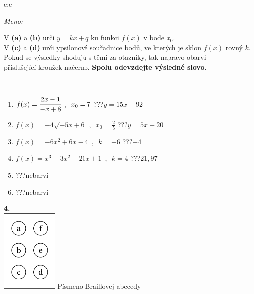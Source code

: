 \documentclass[10pt]{report}
\begin{document}
\begin{tabular}{c:c}
\begin{minipage}[c][104.5mm][t]{0.5\linewidth}
\begin{center}
\textit{Meno:}\phantom{xxxxxxxxxxxxxxxxxxxxxxxxxxxxxxxxxxxxxxxxxxxxxxxxxxxxxxxxxxxxxxxxx}\\[5mm]
\begin{minipage}{0.95\linewidth}
\begin{center}
V \textbf{(a)} a \textbf{(b)} urči  $y = kx + q$ ku funkci $f(x)$ v bode $x_0$.\\V \textbf{(c)} a \textbf{(d)} urči ypsilonové souřadnice bodů, ve kterých je sklon $f(x)$ rovný $k$.\\Pokud se výsledky shodujú s těmi za otazníky, tak napravo obarvi\\příslušející kroužek načerno. \textbf{Spolu odevzdejte výsledné slovo}.
\end{center}
\end{minipage}
\\[1mm]
\begin{minipage}{0.79\linewidth}
\begin{center}
\begin{varwidth}{\linewidth}
\begin{enumerate}
\small
\item $f(x)=\cfrac{2x-1}{-x+8}\enspace , \enspace x_0=7$\quad \dotfill\; ???\;\dotfill \quad $y = 15x-92$
\item $f(x)=-4\sqrt{-5x+6}\enspace , \enspace x_0=\frac{2}{5}$\quad \dotfill\; ???\;\dotfill \quad $y = 5x-20$
\item $f(x)=-6x^2+6x-4\enspace , \enspace k=-6$\quad \dotfill\; ???\;\dotfill \quad $-4$
\item $f(x)=x^3-3x^2-20x+1\enspace , \enspace k=4$\quad \dotfill\; ???\;\dotfill \quad $21 , 97$
\item \quad \dotfill\; ???\;\dotfill \quad nebarvi
\item \quad \dotfill\; ???\;\dotfill \quad nebarvi
\end{enumerate}
\end{varwidth}
\end{center}
\end{minipage}
\begin{minipage}{0.20\linewidth}
\begin{center}
{\Huge\bfseries 4.} \\[2mm]
\includegraphics[height=40mm]{../images/braille.png}
{\small Písmeno Braillovej abecedy}
\end{center}
\end{minipage}
\end{center}
\end{minipage}
%
\end{tabular}
\end{document}
